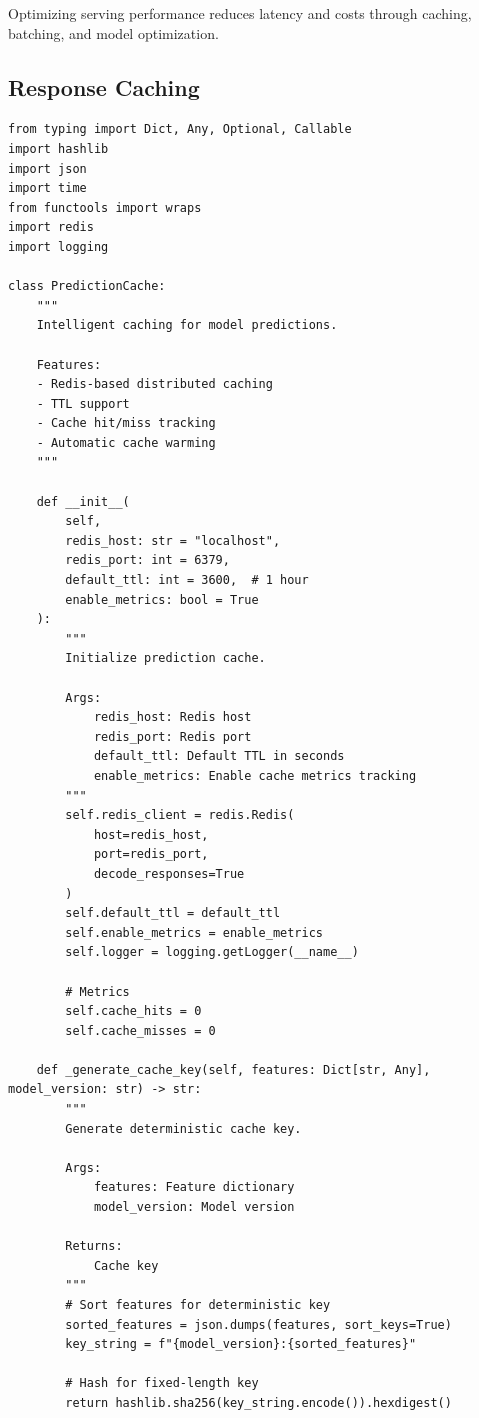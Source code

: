 Optimizing serving performance reduces latency and costs through caching, batching, and model optimization.

\subsection{Response Caching}

\begin{lstlisting}[style=python, caption={Intelligent Response Caching}]
from typing import Dict, Any, Optional, Callable
import hashlib
import json
import time
from functools import wraps
import redis
import logging

class PredictionCache:
    """
    Intelligent caching for model predictions.

    Features:
    - Redis-based distributed caching
    - TTL support
    - Cache hit/miss tracking
    - Automatic cache warming
    """

    def __init__(
        self,
        redis_host: str = "localhost",
        redis_port: int = 6379,
        default_ttl: int = 3600,  # 1 hour
        enable_metrics: bool = True
    ):
        """
        Initialize prediction cache.

        Args:
            redis_host: Redis host
            redis_port: Redis port
            default_ttl: Default TTL in seconds
            enable_metrics: Enable cache metrics tracking
        """
        self.redis_client = redis.Redis(
            host=redis_host,
            port=redis_port,
            decode_responses=True
        )
        self.default_ttl = default_ttl
        self.enable_metrics = enable_metrics
        self.logger = logging.getLogger(__name__)

        # Metrics
        self.cache_hits = 0
        self.cache_misses = 0

    def _generate_cache_key(self, features: Dict[str, Any], model_version: str) -> str:
        """
        Generate deterministic cache key.

        Args:
            features: Feature dictionary
            model_version: Model version

        Returns:
            Cache key
        """
        # Sort features for deterministic key
        sorted_features = json.dumps(features, sort_keys=True)
        key_string = f"{model_version}:{sorted_features}"

        # Hash for fixed-length key
        return hashlib.sha256(key_string.encode()).hexdigest()


\end{lstlisting}
